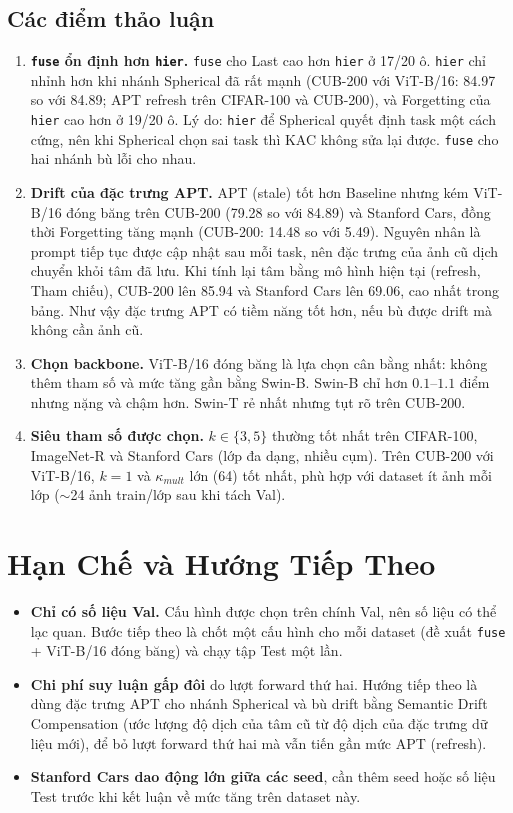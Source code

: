 \documentclass[10pt,a4paper]{article}
\begin{document}
\subsection{Các điểm thảo luận}
\begin{enumerate}
  \item \textbf{\texttt{fuse} ổn định hơn \texttt{hier}.} \texttt{fuse} cho Last cao hơn \texttt{hier} ở 17/20 ô. \texttt{hier} chỉ nhỉnh hơn khi nhánh Spherical đã rất mạnh (CUB-200 với ViT-B/16: 84.97 so với 84.89; APT refresh trên CIFAR-100 và CUB-200), và Forgetting của \texttt{hier} cao hơn ở 19/20 ô. Lý do: \texttt{hier} để Spherical quyết định task một cách cứng, nên khi Spherical chọn sai task thì KAC không sửa lại được. \texttt{fuse} cho hai nhánh bù lỗi cho nhau.
  \item \textbf{Drift của đặc trưng APT.} APT (stale) tốt hơn Baseline nhưng kém ViT-B/16 đóng băng trên CUB-200 (79.28 so với 84.89) và Stanford Cars, đồng thời Forgetting tăng mạnh (CUB-200: 14.48 so với 5.49). Nguyên nhân là prompt tiếp tục được cập nhật sau mỗi task, nên đặc trưng của ảnh cũ dịch chuyển khỏi tâm đã lưu. Khi tính lại tâm bằng mô hình hiện tại (refresh, Tham chiếu), CUB-200 lên 85.94 và Stanford Cars lên 69.06, cao nhất trong bảng. Như vậy đặc trưng APT có tiềm năng tốt hơn, nếu bù được drift mà không cần ảnh cũ.
  \item \textbf{Chọn backbone.} ViT-B/16 đóng băng là lựa chọn cân bằng nhất: không thêm tham số và mức tăng gần bằng Swin-B. Swin-B chỉ hơn $0.1$--$1.1$ điểm nhưng nặng và chậm hơn. Swin-T rẻ nhất nhưng tụt rõ trên CUB-200.
  \item \textbf{Siêu tham số được chọn.} $k\in\{3,5\}$ thường tốt nhất trên CIFAR-100, ImageNet-R và Stanford Cars (lớp đa dạng, nhiều cụm). Trên CUB-200 với ViT-B/16, $k=1$ và $\kappa_{mult}$ lớn (64) tốt nhất, phù hợp với dataset ít ảnh mỗi lớp ($\sim$24 ảnh train/lớp sau khi tách Val).
\end{enumerate}

\section{Hạn Chế và Hướng Tiếp Theo}
\begin{itemize}
  \item \textbf{Chỉ có số liệu Val.} Cấu hình được chọn trên chính Val, nên số liệu có thể lạc quan. Bước tiếp theo là chốt một cấu hình cho mỗi dataset (đề xuất \texttt{fuse} + ViT-B/16 đóng băng) và chạy tập Test một lần.
  \item \textbf{Chi phí suy luận gấp đôi} do lượt forward thứ hai. Hướng tiếp theo là dùng đặc trưng APT cho nhánh Spherical và bù drift bằng Semantic Drift Compensation (ước lượng độ dịch của tâm cũ từ độ dịch của đặc trưng dữ liệu mới), để bỏ lượt forward thứ hai mà vẫn tiến gần mức APT (refresh).
  \item \textbf{Stanford Cars dao động lớn giữa các seed}, cần thêm seed hoặc số liệu Test trước khi kết luận về mức tăng trên dataset này.
\end{itemize}
\end{document}
